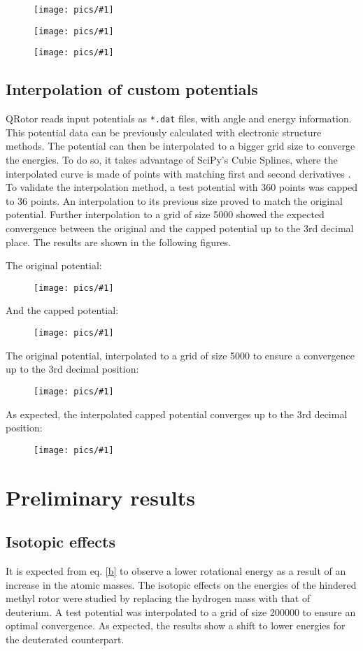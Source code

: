 \documentclass[12pt,a4paper]{article}
\newcommand{\NEWPICC}[2]{
\begin{figure}[H]
    \centering
    \texttt{[image: pics/\#1]}
    \label{#1}
    \end{figure}
    }
\begin{document}
\NEWPICC{titov2023_2.png}{1}
\NEWPICC{titov2023_op_2.png}{1}

\NEWPICC{convergence_E2_00004.png}{1}


\subsection{Interpolation of custom potentials}


QRotor reads input potentials as \texttt{*.dat} files, with angle and energy information.
This potential data can be previously calculated with electronic structure methods. The potential can then be interpolated to a bigger grid size to converge the energies. To do so, it takes advantage of SciPy's Cubic Splines, where the interpolated curve is made of points with matching first and second derivatives \cite{cubicsplines}.\\

To validate the interpolation method, a test potential with 360 points was capped to 36 points. An interpolation to its previous size proved to match the original potential. Further interpolation to a grid of size 5000 showed the expected convergence between the original and the capped potential up to the 3rd decimal place. The results are shown in the following figures.

\newpage

The original potential:
\NEWPICC{interpolate_potential_360.png}{1}
And the capped potential:
\NEWPICC{interpolate_potential_36.png}{1}

\newpage

The original potential, interpolated to a grid of size 5000 to ensure a convergence up to the 3rd decimal position:
\NEWPICC{interpolate_potential_5000.png}{1}
As expected, the interpolated capped potential converges up to the 3rd decimal position:
\NEWPICC{interpolate_potential_5000-from-36.png}{1}


\section{Preliminary results}


\subsection{Isotopic effects}


It is expected from eq. \eqref{b} to observe a lower rotational energy as a result of an increase in the atomic masses. The isotopic effects on the energies of the hindered methyl rotor were studied by replacing the hydrogen mass with that of deuterium. A test potential was interpolated to a grid of size 200000 to ensure an optimal convergence. As expected, the results show a shift to lower energies for the deuterated counterpart.
\end{document}
